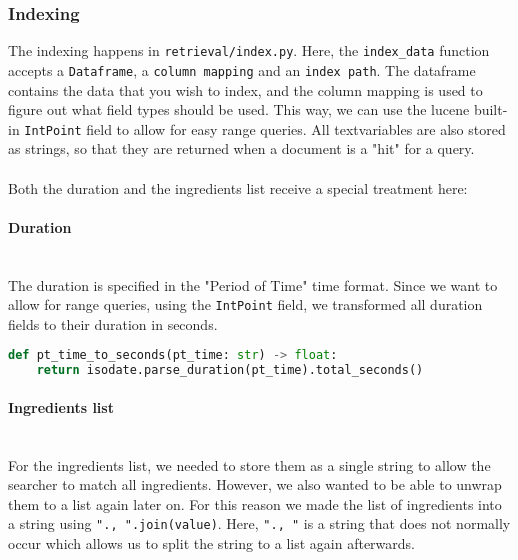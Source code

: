 \documentclass{article}
\newcommand{\subsubsubsection}[1]{\paragraph{#1}\mbox{}\\}
\begin{document}
\subsubsection{Indexing}
The indexing happens in \texttt{retrieval/index.py}. Here, the \texttt{index\_data}
function accepts a \texttt{Dataframe}, a \texttt{column mapping} and an \texttt{index path}.
The dataframe contains the data that you wish to index, and the column mapping
is used to figure out what field types should be used. This way, we can use
the lucene built-in \texttt{IntPoint} field to allow for easy range queries.
All textvariables are also stored as strings, so that they are returned when
a document is a "hit" for a query.\\~\\
Both the duration and the ingredients list receive a special treatment here:
\subsubsubsection{Duration}
The duration is specified in the "Period of Time" time format. Since we want
to allow for range queries, using the \texttt{IntPoint} field, we transformed
all duration fields to their duration in seconds.
\begin{lstlisting}[language=Python]
def pt_time_to_seconds(pt_time: str) -> float:
    return isodate.parse_duration(pt_time).total_seconds()
\end{lstlisting}
\subsubsubsection{Ingredients list}
For the ingredients list, we needed to store them as a single string to allow
the searcher to match all ingredients. However, we also wanted to be able to
unwrap them to a list again later on. For this reason we made the list of
ingredients into a string using \texttt{"., ".join(value)}. Here, \texttt{"., "}
is a string that does not normally occur which allows us to split the string
to a list again afterwards.
\newpage
\end{document}
